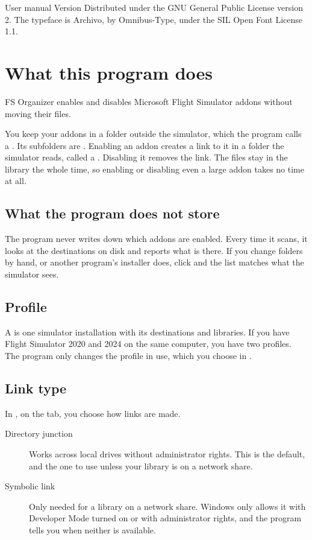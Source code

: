 \documentclass[11pt,a4paper]{article}
\begin{document}
\frenchspacing

\fsorgtitle
  {User manual}
  {Version }
  {Distributed under the GNU General Public License version 2.}
  {The typeface is Archivo, by Omnibus-Type, under the SIL Open Font License 1.1.}

\thispagestyle{empty}
\tableofcontents

\section{What this program does}

FS Organizer enables and disables Microsoft Flight Simulator addons without
moving their files.

You keep your addons in a folder outside the simulator, which the program calls
a . Its subfolders are . Enabling an addon creates a
link to it in a folder the simulator reads, called a .
Disabling it removes the link. The files stay in the library the whole time, so
enabling or disabling even a large addon takes no time at all.

\subsection{What the program does not store}

The program never writes down which addons are enabled. Every time it scans, it
looks at the destinations on disk and reports what is there. If you change
folders by hand, or another program's installer does, click  and the
list matches what the simulator sees.

\subsection{Profile}

A  is one simulator installation with its destinations and
libraries. If you have Flight Simulator 2020 and 2024 on the same computer, you
have two profiles. The program only changes the profile in use, which you
choose in .

\subsection{Link type}

In , on the  tab, you choose how links are made.

\begin{description}
  \item[Directory junction] Works across local drives without administrator
    rights. This is the default, and the one to use unless your library is on
    a network share.
  \item[Symbolic link] Only needed for a library on a network share. Windows
    only allows it with Developer Mode turned on or with administrator rights,
    and the program tells you when neither is available.
\end{description}
\end{document}
